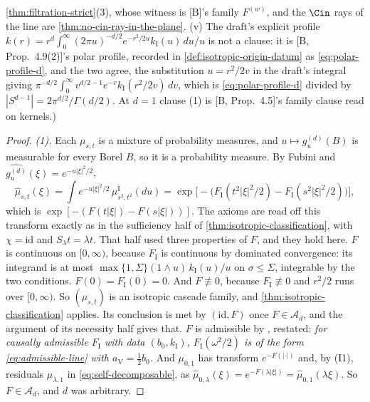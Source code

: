 \begin{proposition}
{\ref{thm:filtration-strict}(3), whose witness is [B]'s family $F^{(w)}$, and the $\Cin$ rays of the
line are \ref{thm:no-cin-ray-in-the-plane}. (v) The draft's explicit profile
$k(r) = r^d\int_0^\infty(2\pi u)^{-d/2}e^{-r^2/2u}k_{\mathrm I}(u)\,du/u$ is not a clause: it is
[B, Prop.~4.9(2)]'s polar profile, recorded in \ref{def:isotropic-origin-datum} as
\ref{eq:polar-profile-d}, and the two agree, the substitution $u = r^2/2v$ in the draft's integral
giving $\pi^{-d/2}\int_0^\infty v^{d/2-1}e^{-v}k_{\mathrm I}(r^2/2v)\,dv$, which is
\ref{eq:polar-profile-d} divided by $|S^{d-1}| = 2\pi^{d/2}/\Gamma(d/2)$. At $d = 1$ clause (1) is
[B, Prop.~4.5]'s family clause read on kernels.)}
\end{proposition}

\begin{proof}
\leanok
\emph{(1).} Each $\mu_{s,t}$ is a mixture of probability measures, and $u \mapsto g^{(d)}_u(B)$
is measurable for every Borel $B$, so it is a probability measure. By Fubini and
$\widehat{g^{(d)}_u}(\xi) = e^{-u|\xi|^2/2}$,
\[
  \widehat\mu_{s,t}(\xi) = \int e^{-u|\xi|^2/2}\,\mu^{\mathrm I}_{s^2,t^2}(du)
   = \exp\bigl[-\bigl(F_{\mathrm I}(t^2|\xi|^2/2) - F_{\mathrm I}(s^2|\xi|^2/2)\bigr)\bigr] ,
\]
which is $\exp[-(F(t|\xi|) - F(s|\xi|))]$.
The axioms are read off this transform exactly as in the sufficiency half of
\ref{thm:isotropic-classification}, with $\chi = \mathrm{id}$ and $S_\lambda t = \lambda t$. That
half used three properties of $F$, and they hold here. $F$ is continuous on $[0,\infty)$, because
$F_{\mathrm I}$ is continuous by dominated convergence: its integrand is at most
$\max\{1,\Sigma\}(1 \wedge u)\,k_{\mathrm I}(u)/u$ on $\sigma \le \Sigma$, integrable by the two
conditions. $F(0) = F_{\mathrm I}(0) = 0$. And $F \not\equiv 0$, because $F_{\mathrm I} \not\equiv 0$
and $r^2/2$ runs over $[0,\infty)$. So $(\mu_{s,t})$ is an
isotropic cascade family, and \ref{thm:isotropic-classification} applies. Its conclusion is met by
$(\mathrm{id},F)$ once $F \in \mathcal{A}_d$, and the argument of its necessity half gives that.
$F$ is admissible by , restated: \emph{for causally admissible $F_{\mathrm I}$ with
data $(b_0,k_{\mathrm I})$, $F_{\mathrm I}(\omega^2/2)$ is of the form \ref{eq:admissible-line}
with $a_{\mathrm V} = \tfrac12 b_0$.} And $\mu_{0,1}$ has transform $e^{-F(|\cdot|)}$ and, by
(I1), residuals $\mu_{\lambda,1}$ in \ref{eq:self-decomposable}, as $\widehat\mu_{0,\lambda}(\xi)
= e^{-F(\lambda|\xi|)} = \widehat\mu_{0,1}(\lambda\xi)$. So $F \in \mathcal{A}_d$, and $d$ was
arbitrary.


\end{proof}
